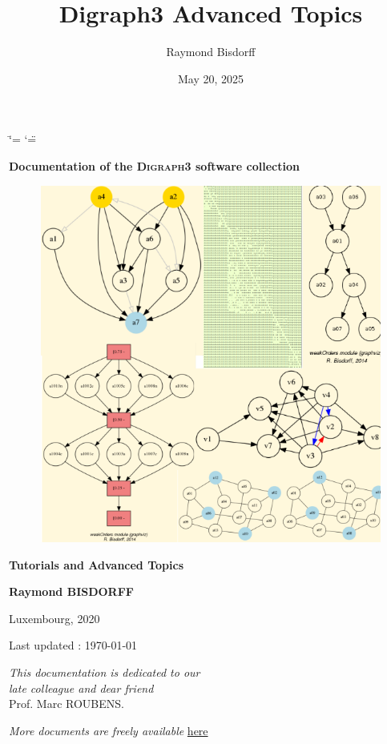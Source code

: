 \documentclass[a4paper,12pt,english]{sphinxhowto}
\title{Digraph3 Advanced Topics}
\date{May 20, 2025}
\author{Raymond Bisdorff}
\begin{document}
\ifdefined\shorthandoff
  \ifnum\catcode`\=\string=\active\shorthandoff{=}\fi
  \ifnum\catcode`\"=\active{}\fi
\fi

\pagestyle{empty}


    \begin{titlepage}
        \centering

        \vspace*{10mm} %
        \textbf{\Large {Documentation of the \textsc{Digraph3} software collection}}

        \vspace{5mm}
        \begin{figure}[!h]
            \centering
            \includegraphics[scale=0.5]{introDoc3.png}
        \end{figure}

        \vspace{10mm}
        \textbf{\Huge {Tutorials and Advanced Topics}}

        \textbf{Raymond BISDORFF}

        \small Luxembourg,  2020

        \small  Last updated : \today
        
        \vspace{10mm}
        \begin{center}
        \emph{This documentation is dedicated to our}\\
        \emph{late colleague and dear friend}\\
         Prof. Marc ROUBENS.
        \end{center}

        \vfill
        \textit{More documents are freely available }{\href{https://digraph3.readthedocs.io/en/latest}{here}}
    \end{titlepage}
\end{document}
